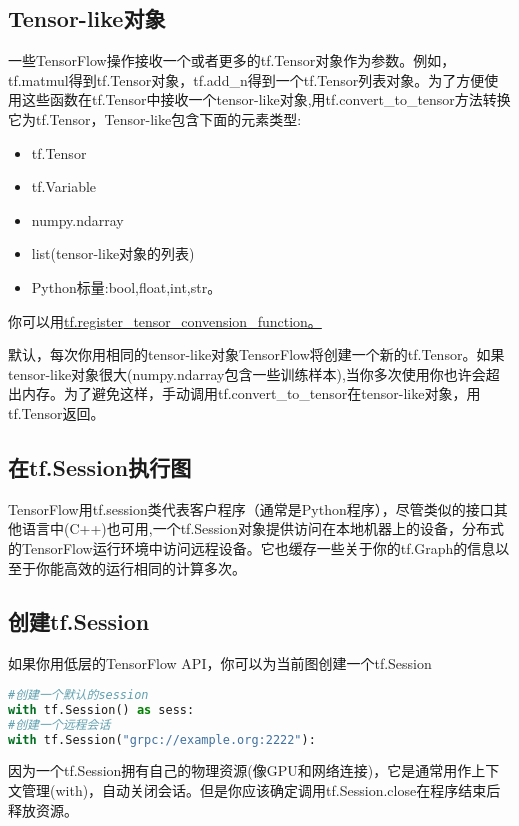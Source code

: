 \subsection{Tensor-like对象}
一些TensorFlow操作接收一个或者更多的tf.Tensor对象作为参数。例如，tf.matmul得到tf.Tensor对象，tf.add\_n得到一个tf.Tensor列表对象。为了方便使用这些函数在tf.Tensor中接收一个tensor-like对象,用tf.convert\_to\_tensor方法转换它为tf.Tensor，Tensor-like包含下面的元素类型:
\begin{itemize}
\item tf.Tensor
\item tf.Variable
\item numpy.ndarray
\item list(tensor-like对象的列表)
\item Python标量:bool,float,int,str。
\end{itemize}
你可以用\href{https://www.tensorflow.org/api_docs/python/tf/register_tensor_conversion_function?hl=zh-cn}{tf.register\_tensor\_convension\_function。}

默认，每次你用相同的tensor-like对象TensorFlow将创建一个新的tf.Tensor。如果tensor-like对象很大(numpy.ndarray包含一些训练样本),当你多次使用你也许会超出内存。为了避免这样，手动调用tf.convert\_to\_tensor在tensor-like对象，用tf.Tensor返回。
\subsection{在tf.Session执行图}
TensorFlow用tf.session类代表客户程序（通常是Python程序），尽管类似的接口其他语言中(C++)也可用,一个tf.Session对象提供访问在本地机器上的设备，分布式的TensorFlow运行环境中访问远程设备。它也缓存一些关于你的tf.Graph的信息以至于你能高效的运行相同的计算多次。
\subsection{创建tf.Session}
如果你用低层的TensorFlow API，你可以为当前图创建一个tf.Session
\begin{lstlisting}[language=Python]
#创建一个默认的session
with tf.Session() as sess:
#创建一个远程会话
with tf.Session("grpc://example.org:2222"):
\end{lstlisting}
因为一个tf.Session拥有自己的物理资源(像GPU和网络连接)，它是通常用作上下文管理(with)，自动关闭会话。但是你应该确定调用tf.Session.close在程序结束后释放资源。

